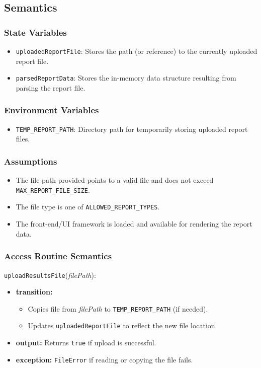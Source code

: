 \documentclass[12pt, titlepage]{article}
\begin{document}
\subsection{Semantics}

\subsubsection{State Variables}

\begin{itemize}
    \item \texttt{uploadedReportFile}: Stores the path (or reference) to the currently uploaded report file.
    \item \texttt{parsedReportData}: Stores the in-memory data structure resulting from parsing the report file.
\end{itemize}

\subsubsection{Environment Variables}

\begin{itemize}
    \item \texttt{TEMP\_REPORT\_PATH}: Directory path for temporarily storing uploaded report files.
\end{itemize}

\subsubsection{Assumptions}

\begin{itemize}
    \item The file path provided points to a valid file and does not exceed \texttt{MAX\_REPORT\_FILE\_SIZE}.
    \item The file type is one of \texttt{ALLOWED\_REPORT\_TYPES}.
    \item The front-end/UI framework is loaded and available for rendering the report data.
\end{itemize}

\subsubsection{Access Routine Semantics}

\noindent \texttt{uploadResultsFile}(\textit{filePath}):
\begin{itemize}
    \item \textbf{transition:}
    \begin{itemize}
        \item Copies file from \textit{filePath} to \texttt{TEMP\_REPORT\_PATH} (if needed).
        \item Updates \texttt{uploadedReportFile} to reflect the new file location.
    \end{itemize}
    \item \textbf{output:} Returns \texttt{true} if upload is successful.
    \item \textbf{exception:} \texttt{FileError} if reading or copying the file fails.
\end{itemize}
\end{document}
